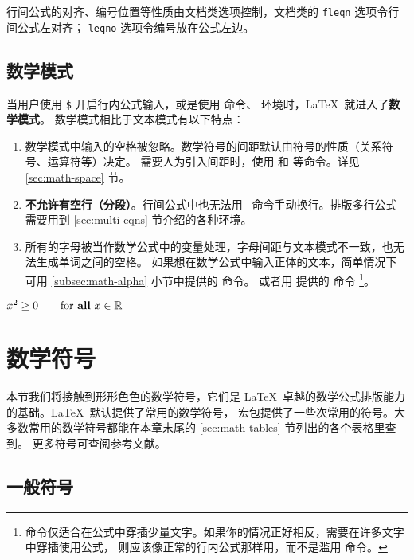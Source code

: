 行间公式的对齐、编号位置等性质由文档类选项控制，文档类的 \texttt{fleqn} 选项令行间公式左对齐；
\texttt{leqno} 选项令编号放在公式左边。

\subsection{数学模式}\label{subsec:math-mode}

当用户使用 \texttt\$ 开启行内公式输入，或是使用 \cmd{[} 命令、 环境时，\LaTeX\ 就进入了\textbf{数学模式}。
数学模式相比于文本模式有以下特点：
\begin{enumerate}
  \item 数学模式中输入的空格被忽略。数学符号的间距默认由符号的性质（关系符号、运算符等）决定。
  需要人为引入间距时，使用  和  等命令。详见 \ref{sec:math-space} 节。
  \item \textbf{不允许有空行（分段）}。行间公式中也无法用 \crcmd\ 命令手动换行。排版多行公式需要用到
  \ref{sec:multi-eqns} 节介绍的各种环境。
  \item 所有的字母被当作数学公式中的变量处理，字母间距与文本模式不一致，也无法生成单词之间的空格。
  如果想在数学公式中输入正体的文本，简单情况下可用 \ref{subsec:math-alpha} 小节中提供的  命令。
  或者用  提供的  命令%
  \footnote{ 命令仅适合在公式中穿插少量文字。如果你的情况正好相反，需要在许多文字中穿插使用公式，
  则应该像正常的行内公式那样用，而不是滥用  命令。}。
\end{enumerate}
\begin{example}
$x^{2} \geq 0 \qquad
\text{for \textbf{all} }
x\in\mathbb{R}$
\end{example}

\section{数学符号}\label{sec:math-symbols}

\def\msym#1{$\csname #1\endcsname$ (\cmd{#1})}

本节我们将接触到形形色色的数学符号，它们是 \LaTeX\ 卓越的数学公式排版能力的基础。\LaTeX\ 默认提供了常用的数学符号，
 宏包提供了一些次常用的符号。大多数常用的数学符号都能在本章末尾的 \ref{sec:math-tables} 节列出的各个表格里查到。
更多符号可查阅参考文献\cite{symbols}。

\subsection{一般符号}\label{subsec:math-general}

